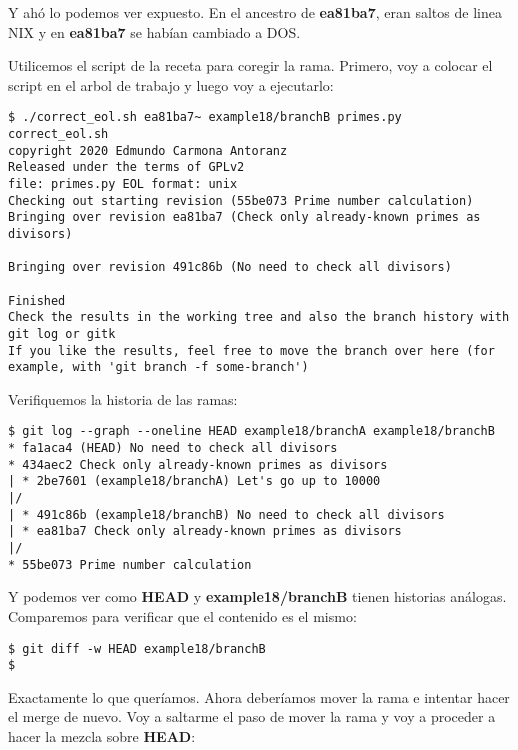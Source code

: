 Y ahó lo podemos ver expuesto. En el ancestro de {\bf ea81ba7}, eran saltos de linea NIX y en {\bf ea81ba7} se habían cambiado a DOS.

Utilicemos el script de la receta para coregir la rama. Primero, voy a colocar el script en el arbol de trabajo y luego voy a
ejecutarlo:

\begin{lstlisting}[style=console_style,
	basicstyle=\small,
	caption={\bf Ejemplo 18} - corriendo el script]
$ ./correct_eol.sh ea81ba7~ example18/branchB primes.py
correct_eol.sh
copyright 2020 Edmundo Carmona Antoranz
Released under the terms of GPLv2
file: primes.py EOL format: unix
Checking out starting revision (55be073 Prime number calculation)
Bringing over revision ea81ba7 (Check only already-known primes as divisors)

Bringing over revision 491c86b (No need to check all divisors)

Finished
Check the results in the working tree and also the branch history with git log or gitk
If you like the results, feel free to move the branch over here (for example, with 'git branch -f some-branch')
\end{lstlisting}

Verifiquemos la historia de las ramas:

\begin{lstlisting}[style=console_style,
	basicstyle=\small,
	caption={\bf Ejemplo 18} - mirando la historia]
$ git log --graph --oneline HEAD example18/branchA example18/branchB
* fa1aca4 (HEAD) No need to check all divisors
* 434aec2 Check only already-known primes as divisors
| * 2be7601 (example18/branchA) Let's go up to 10000
|/  
| * 491c86b (example18/branchB) No need to check all divisors
| * ea81ba7 Check only already-known primes as divisors
|/  
* 55be073 Prime number calculation
\end{lstlisting}

Y podemos ver como {\bf HEAD} y {\bf example18/branchB} tienen historias análogas. Comparemos para verificar que el contenido es
el mismo:

\begin{lstlisting}[style=console_style,
	basicstyle=\small,
	caption={\bf Ejemplo 18} - Comparando resultados]
$ git diff -w HEAD example18/branchB
$
\end{lstlisting}

Exactamente lo que queríamos. Ahora deberíamos mover la rama e intentar hacer el merge de nuevo. Voy a saltarme el paso de mover la rama
y voy a proceder a hacer la mezcla sobre {\bf HEAD}:

